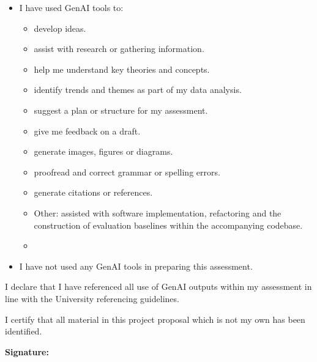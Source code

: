\documentclass[11pt,a4paper]{article}
\begin{document}
\begin{itemize}[label={\ $\square$\ }, leftmargin=*]

  \item[{\ $\text{\rlap{$\checkmark$}}\square$\ }] I have used GenAI tools to:
  \begin{itemize}[label={\ $\square$\ }, leftmargin=*]
    \item[{\ $\text{\rlap{$\checkmark$}}\square$\ }] develop ideas.
    \item assist with research or gathering information.
    \item help me understand key theories and concepts.
    \item[{\ $\text{\rlap{$\checkmark$}}\square$\ }] identify trends and themes as part of my data analysis.
    \item[{\ $\text{\rlap{$\checkmark$}}\square$\ }] suggest a plan or structure for my assessment.
    \item[{\ $\text{\rlap{$\checkmark$}}\square$\ }] give me feedback on a draft.
    \item generate images, figures or diagrams.
    \item[{\ $\text{\rlap{$\checkmark$}}\square$\ }] proofread and correct grammar or spelling errors.
    \item generate citations or references.
    \item[{\ $\text{\rlap{$\checkmark$}}\square$\ }] Other: assisted with software implementation, refactoring and the
      construction of evaluation baselines within the accompanying codebase.
    \item[]
  \end{itemize}

  \item I have not used any GenAI tools in preparing this assessment.
\end{itemize}

\bigskip
I declare that I have referenced all use of GenAI outputs within my assessment in
line with the University referencing guidelines.

\vspace{1em}
I certify that all material in this project proposal which is not my own has been
identified.

\vspace{5em}
{\bf\noindent Signature:} \hrulefill
\newpage

\tableofcontents
\thispagestyle{empty}
\newpage

\clearpage
{}
\end{document}
